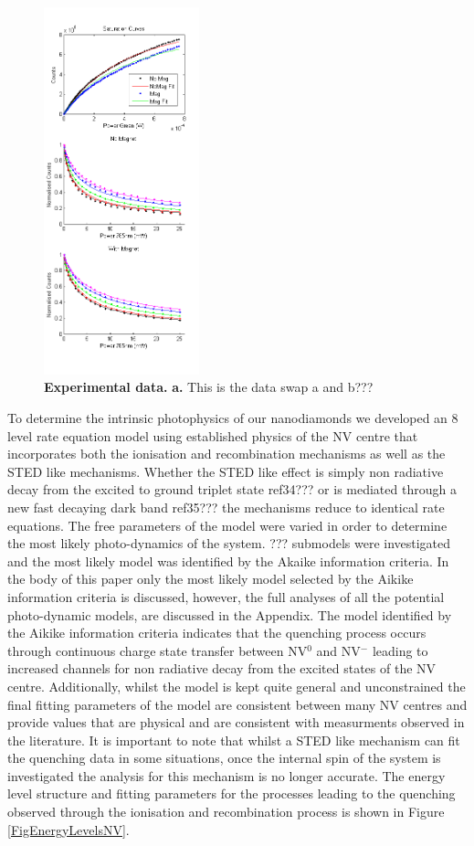 \documentclass[prl]{revtex4}
\begin{document}
\begin{figure}[H]
  \centering
  \includegraphics[width=0.4\textwidth]{DataCurves.png} 
 \caption{\textbf{Experimental data.} \textbf{a.} This is the data swap a and b???} \label{FigData}
\end{figure}

To determine the intrinsic photophysics of our nanodiamonds we developed an 8 level rate equation model using established physics of the NV centre that incorporates both the ionisation and recombination mechanisms as well as the STED like mechanisms. Whether the STED like effect is simply non radiative decay from the excited to ground triplet state ref34??? or is mediated through a new fast decaying dark band ref35??? the mechanisms reduce to identical rate equations. The free parameters of the model were varied in order to determine the most likely photo-dynamics of the system. ??? submodels were investigated and the most likely model was identified by the Akaike information criteria. In the body of this paper only the most likely model selected by the Aikike information criteria is discussed, however, the full analyses of all the potential photo-dynamic models, are discussed in the Appendix. The model identified by the Aikike information criteria indicates that the quenching process occurs through continuous charge state transfer between NV$^0$ and NV$^-$ leading to increased channels for non radiative decay from the excited states of the NV centre. Additionally, whilst the model is kept quite general and unconstrained the final fitting parameters of the model are consistent between many NV centres and provide values that are physical and are consistent with measurments observed in the literature. It is important to note that whilst a STED like mechanism can fit the quenching data in some situations, once the internal spin of the system is investigated the analysis for this mechanism is no longer accurate. The energy level structure and fitting parameters for the processes leading to the quenching observed through the ionisation and recombination process is shown in Figure \ref{FigEnergyLevelsNV}.
\end{document}

